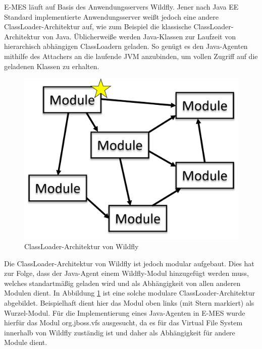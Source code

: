 E-MES läuft auf Basis des Anwendungsservers Wildfly. Jener nach Java EE Standard implementierte Anwendungsserver weißt jedoch eine andere ClassLoader-Architektur auf, wie zum Beispiel die klassische ClassLoader-Architektur von Java. Üblicherweiße werden Java-Klassen zur Laufzeit von hierarchisch abhängigen ClassLoadern geladen. So genügt es den Java-Agenten mithilfe des \glqq Attachers\grqq{} an die laufende JVM anzubinden, um vollen Zugriff auf die geladenen Klassen zu erhalten.

\begin{figure}[h]
    \includegraphics[width=0.5\linewidth]{images/Modules.png}
    \centering
    \caption{ClassLoader-Architektur von Wildfly}
    \label{fig:wildflyModules}
\end{figure}

Die ClassLoader-Architektur von Wildfly ist jedoch modular aufgebaut. Dies hat zur Folge, dass der Java-Agent einem Wildfly-Modul hinzugefügt werden muss, welches standartmäßig geladen wird und als Abhängigkeit von allen anderen Modulen dient. In Abbildung \ref{fig:wildflyModules} ist eine solche modulare ClassLoader-Architektur abgebildet. Beispielhaft dient hier das Modul oben links (mit Stern markiert) als \glqq Wurzel-Modul\grqq{}. Für die Implementierung eines Java-Agenten in E-MES wurde hierfür das Modul \glqq org.jboss.vfs\grqq{} ausgesucht, da es für das \glqq Virtual File System\grqq{} innerhalb von Wildfly zuständig ist und daher als Abhängigkeit für andere Module dient.